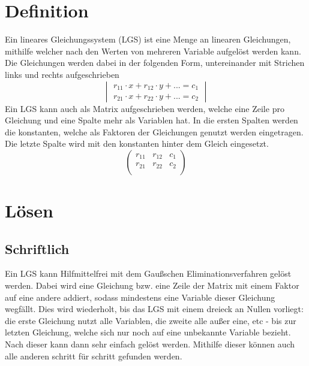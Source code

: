 \documentclass{article}
\begin{document}
\section{Definition}
Ein lineares Gleichungssystem (LGS) ist eine Menge an linearen Gleichungen, mithilfe welcher nach den Werten von mehreren Variable aufgelöst werden kann. Die Gleichungen werden dabei in der folgenden Form, untereinander mit Strichen links und rechts aufgeschrieben
\[
\begin{vmatrix}
 r_{11} \cdot x + r_{12} \cdot y + ... = c_1 \\
 r_{21} \cdot x + r_{22} \cdot y + ... = c_2 
\end{vmatrix}
\] 
Ein LGS kann auch als Matrix aufgeschrieben werden, welche eine Zeile pro Gleichung und eine Spalte mehr als Variablen hat. In die ersten Spalten werden die konstanten, welche als Faktoren der Gleichungen genutzt werden eingetragen. Die letzte Spalte wird mit den konstanten hinter dem Gleich eingesetzt.
\[
\begin{pmatrix}
 r_{11} & r_{12} & c_1 \\
 r_{21} & r_{22} & c_2 \\
\end{pmatrix}
\] 
 
\section{Lösen}
\subsection{Schriftlich}
Ein LGS kann Hilfmittelfrei mit dem Gaußschen Eliminationsverfahren gelöst werden. Dabei wird eine Gleichung bzw. eine Zeile der Matrix mit einem Faktor auf eine andere addiert, sodass mindestens eine Variable dieser Gleichung wegfällt. Dies wird wiederholt, bis das LGS mit einem dreieck an Nullen vorliegt: die erste Gleichung nutzt alle Variablen, die zweite alle außer eine, etc - bis zur letzten Gleichung, welche sich nur noch auf eine unbekannte Variable bezieht. Nach dieser kann dann sehr einfach gelöst werden. Mithilfe dieser können auch alle anderen schritt für schritt gefunden werden. 
 
\end{document}
